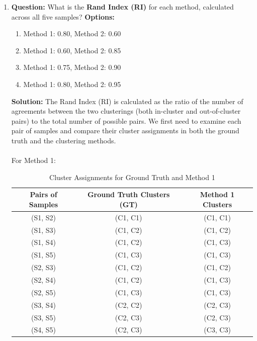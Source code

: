 \documentclass{article}
\begin{document}
\begin{enumerate}
    \item \textbf{Question:} \newline
    What is the \textbf{Rand Index (RI)} for each method, calculated across all five samples?
    \newline \newline
    \textbf{Options:}
    \begin{enumerate}
        \item Method 1: 0.80, Method 2: 0.60
        \item Method 1: 0.60, Method 2: 0.85
        \item Method 1: 0.75, Method 2: 0.90
        \item Method 1: 0.80, Method 2: 0.95
    \end{enumerate}
    
    \textbf{Solution:} \newline
    The Rand Index (RI) is calculated as the ratio of the number of agreements between the two clusterings (both in-cluster and out-of-cluster pairs) to the total number of possible pairs. We first need to examine each pair of samples and compare their cluster assignments in both the ground truth and the clustering methods.\\ \\
    For Method 1: 
    \begin{table}[H]
        \centering
        \begin{tabular}{|c|c|c|}
            \hline
            Pairs of Samples & Ground Truth Clusters (GT) & Method 1 Clusters \\ \hline
            (S1, S2) & (C1, C1) & (C1, C1) \\ \hline
            (S1, S3) & (C1, C2) & (C1, C2) \\ \hline
            (S1, S4) & (C1, C2) & (C1, C3) \\ \hline
            (S1, S5) & (C1, C3) & (C1, C3) \\ \hline
            (S2, S3) & (C1, C2) & (C1, C2) \\ \hline
            (S2, S4) & (C1, C2) & (C1, C3) \\ \hline
            (S2, S5) & (C1, C3) & (C1, C3) \\ \hline
            (S3, S4) & (C2, C2) & (C2, C3) \\ \hline
            (S3, S5) & (C2, C3) & (C2, C3) \\ \hline
            (S4, S5) & (C2, C3) & (C3, C3) \\ \hline
        \end{tabular}
        \caption{Cluster Assignments for Ground Truth and Method 1}
    \end{table}
    

\end{enumerate}
\end{document}

